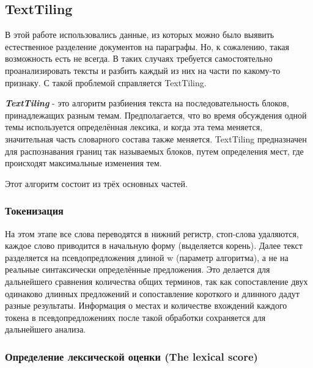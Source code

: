 \documentclass[12pt]{article}
\begin{document}
\subsection{TextTiling}

В этой работе использовались данные, из которых можно было выявить естественное разделение документов на параграфы. Но, к сожалению, такая возможность есть не всегда. В таких случаях требуется самостоятельно проанализировать тексты и разбить каждый из них на части по какому-то признаку. С такой проблемой справляется TextTiling.

\textbf{\textit{TextTiling}} - это алгоритм разбиения текста на последовательность блоков, принадлежащих разным темам. Предполагается, что во время обсуждения одной темы используется определённая лексика, и когда эта тема меняется, значительная часть словарного состава также меняется. TextTiling предназначен для распознавания границ так называемых блоков, путем определения мест, где происходят максимальные изменения тем. 

Этот алгоритм состоит из трёх основных частей.

\subsubsection{Токенизация}
На этом этапе все слова переводятся в нижний регистр, стоп-слова удаляются, каждое слово приводится в начальную форму (выделяется корень). Далее текст разделяется на псевдопредложения длиной w (параметр алгоритма), а не на реальные синтаксически определённые предложения. Это делается для дальнейшего сравнения количества общих терминов, так как сопоставление двух одинаково длинных предложений и сопоставление короткого и длинного дадут разные результаты. Информация о местах и количестве вхождений каждого токена в псевдопредложениях после такой обработки сохраняется для дальнейшего анализа.
		
\subsubsection{Определение лексической оценки (The lexical score)}
		
\end{document}
